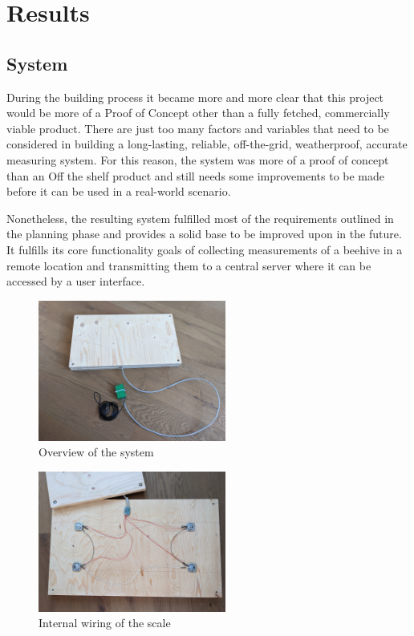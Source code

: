 \chapter{Results}
\section{System}
During the building process it became more and more clear that this project would be more of a \gls{Proof of Concept} other than a fully fetched, commercially viable product. There are just too many factors and variables that need to be considered in building a long-lasting, reliable, off-the-grid, weatherproof, accurate measuring system. For this reason, the system was more of a proof of concept than an \gls{Off the shelf} product and still needs some improvements to be made before it can be used in a real-world scenario.

Nonetheless, the resulting system fulfilled most of the requirements outlined in the planning phase and provides a solid base to be improved upon in the future. It fulfills its core functionality goals of collecting measurements of a beehive in a remote location and transmitting them to a central server where it can be accessed by a user interface. 

\begin{figure}
    \centering
    \includegraphics[width=0.55\textwidth]{figures/scale.jpg}
    \caption{Overview of the system}
    \label{fig:overview}
\end{figure}

\begin{figure}
    \centering
    \includegraphics[width=0.55\textwidth]{figures/scale_wiring.jpg}
    \caption{Internal wiring of the scale}
    \label{fig:overview}
\end{figure}

